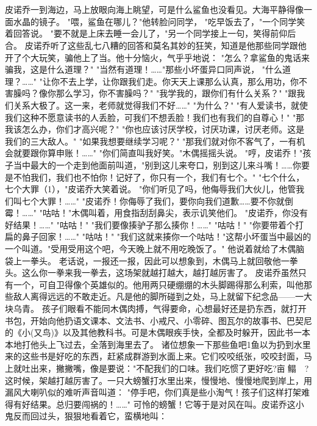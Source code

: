 \documentclass[12pt,UTF8]{ctexbook}
\begin{document}
\chapter{}

皮诺乔一到海边，马上放眼向海上眺望，可是什么鲨鱼也没看见。大海平静得像一面水晶的镜子。
"喂，鲨鱼在哪儿？"他转脸问同学，
"吃早饭去了，"一个同学笑着回答说。
"要不就是上床去睡一会儿了，"另一个同学接上一句，笑得前仰后合。
皮诺乔听了这些乱七八糟的回答和莫名其妙的狂笑，知道是他那些同学跟他开了个大玩笑，骗他上了当。他十分恼火，气乎乎地说：
"怎么？拿鲨鱼的鬼话来骗我，这是什么道理？"
"当然有道理！……"那些小坏蛋异口同声说，
"什么道理？……"
"让你不去上学，让你跟我们走。你天天上课那么认真，那么用功，你不害臊吗？像你那么学习，你不害臊吗？"
"我学我的，跟你们有什么关系？"
"跟我们关系大极了。这一来，老师就觉得我们不好……"
"为什么？"
"有人爱读书，就使我们这种不愿意读书的人丢脸，可我们不想丢脸！我们也有我们的自尊心！"
"那我该怎么办，你们才高兴呢？"
"你也应该讨厌学校，讨厌功课，讨厌老师。这是我们的三大敌人。"
"如果我想要继续学习呢？"
"那我们就对你不客气了，一有机会就要跟你算申账！……"
"你们简直叫我好笑。"木偶摇摇头说。
"哼，皮诺乔！"孩子当中最大的一个走到他面前叫道，"别到这儿来夸口，别到这儿来斗嘴！……你要是不怕我们，我们也不怕你！记好了，你只有一个，我们有七个。"
"七个什么，七个大罪（1），"皮诺乔大笑着说。
"你们听见了吗，他侮辱我们大伙儿，他管我们叫七个大罪！……"
"皮诺乔！你侮辱了我们，要你向我们道歉……要不你就倒霉！……"
"咕咕！"木偶叫着，用食指刮刮鼻尖，表示讥笑他们。
"皮诺乔，你没有好结果！……"
"咕咕！"
"我们要像揍驴子那么揍你！……"
"咕咕！"
"你要带着个打扁的鼻子回家！……"
"咕咕！"
"我们这就来揍你一个咕咕！"这帮小坏蛋当中最凶的一个叫道。"受用受用这个吧，今天晚上就不用吃晚饭了。"
他说着就给了木偶脑袋上一拳头。
老话说，一报还一报，因此可以想象到，木偶马上就回敬他一拳头。这么你一拳来我一拳去，这场架就越打越大，越打越厉害了。
皮诺乔虽然只有一个，可自卫得像个英雄似的。他用两只硬绷绷的木头脚踢得那么利索，叫他那些敌人离得远远的不敢走近。凡是他的脚所碰到之处，马上就留下纪念品——一大块乌青。
孩子们眼看不能同木偶肉搏，气得要命，心想最好还是扔东西，就打开书包，开始向他扔语文课本、文法书、小戒尺、小零碎、图瓦尔的故事书、巴契尼的《小(又鸟)》以及其他教科书。可是木偶眼疾手快，全都及时躲开，因此书一本本地打他头上飞过去，全落到海里去了。
诸位想象一下那些鱼吧1鱼以为扔到水里来的这些书是好吃的东西，赶紧成群游到水面上来。它们咬咬纸张，咬咬封面，马上就吐出来，撇撇嘴，像是要说："不配我们的口味。我们吃惯了更好吃?亩鳎　?
这时候，架越打越厉害了。一只大螃蟹打水里出来，慢慢地、慢慢地爬到岸上，用漏风大喇叭似的难听声音叫道：
"停手吧，你们真是些小淘气！孩子们这样打架难得有好结果。总归要闯祸的！……"
可怜的螃蟹！它等于是对风在叫。皮诺乔这小鬼反而回过头，狠狠地看着它，蛮横地叫：
\end{document}
